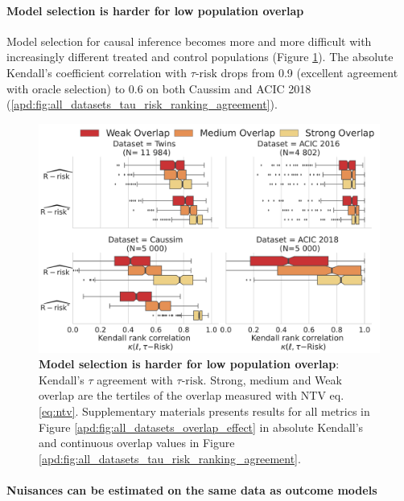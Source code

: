 \documentclass[a4paper,num-refs]{oup-contemporary}%
\begin{document}
\paragraph{Model selection is harder for low population
    overlap}

Model selection for causal inference becomes more and more difficult with
increasingly different treated and control populations (Figure
\ref{fig:all_datasets_overlap_effect_r_risk}). The absolute Kendall's
coefficient correlation with $\tau\text{-risk}$ drops from 0.9
(excellent agreement with oracle selection) to 0.6 on both Caussim and ACIC 2018
(\ref{apd:fig:all_datasets_tau_risk_ranking_agreement}).

\begin{figure}[!h]
    \centering\begin{minipage}{\linewidth}
        \includegraphics[width=\linewidth]{_2_overlap_influence_by_bin_k_by_ds_r_risk_2cols.pdf}
    \end{minipage}
    \caption{\textbf{Model selection is harder for low population
            overlap}:
        Kendall's $\tau$ agreement with $\tau\text{-risk}$. Strong, medium and Weak overlap
        are the tertiles of the overlap measured with NTV eq. \ref{eq:ntv}. Supplementary materials presents results for all
        metrics in Figure \ref{apd:fig:all_datasets_overlap_effect} in absolute
        Kendall's and continuous overlap values in Figure
            {\ref{apd:fig:all_datasets_tau_risk_ranking_agreement}}.}\label{fig:all_datasets_overlap_effect_r_risk}
\end{figure}



\paragraph{Nuisances can be estimated on the same data as outcome models}
\end{document}

